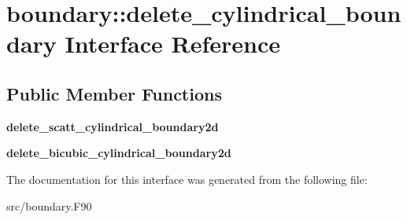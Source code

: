 \hypertarget{interfaceboundary_1_1delete__cylindrical__boundary}{}\section{boundary\+:\+:delete\+\_\+cylindrical\+\_\+boundary Interface Reference}
\label{interfaceboundary_1_1delete__cylindrical__boundary}
\subsection*{Public Member Functions}
\begin{DoxyCompactItemize}
\item 
\mbox{\label{interfaceboundary_1_1delete__cylindrical__boundary_a9297e36153b54483f7f6028e1395ca5f}} 
{\bfseries delete\+\_\+scatt\+\_\+cylindrical\+\_\+boundary2d}
\item 
\mbox{\label{interfaceboundary_1_1delete__cylindrical__boundary_ae192b63adcc923c300b69d7adefbb450}} 
{\bfseries delete\+\_\+bicubic\+\_\+cylindrical\+\_\+boundary2d}
\end{DoxyCompactItemize}


The documentation for this interface was generated from the following file\+:\begin{DoxyCompactItemize}
\item 
src/boundary.\+F90\end{DoxyCompactItemize}
